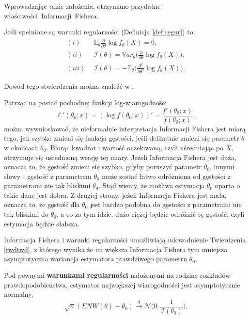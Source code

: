 Wprowadzając takie założenia, otrzymano przydatne właściwości~Informacji~Fishera.

\begin{proposition}\label{prop:warunki}
Jeśli spełnione są warunki regularności (Definicja \ref{def:regur}) to:
\begin{align*}
(i) \ & \ \mathbb{E}_\theta\frac{\partial}{\partial\theta}\log f_{\theta}(X) = 0, \\
(ii) \ & \ \mathcal{I}(\theta) = \mathbb{V}ar_{\theta}\Big(\frac{\partial}{\partial\theta}\log f_{\theta}(X) \Big), \\
(iii) \ & \ \mathcal{I}(\theta) = -\mathbb{E}_{\theta}\Big(\frac{\partial^2}{\partial\theta^2}\log f_\theta(X) \Big).
\end{align*}
\end{proposition}

Dowód tego stwierdzenia można znaleźć w \cite{niemiro}.

\newpage
Patrząc na postać pochodnej funkcji log-wiarogodności
$$\ell'(\theta_0;x) = (\log f(\theta_0;x))' = \dfrac{f'(\theta_0;x)}{f(\theta_0;x)},$$
można wywnioskować, że nieformalnie interpretacja Informacji Fishera jest miarą tego, jak szybko zmieni się funkcja gęstości, jeśli delikatnie zmieni się parametr $\theta$ w okolicach $\theta_0$. Biorąc kwadrat i wartość oczekiwaną, czyli uśredniając po $X$, otrzymuje się uśrednioną wersję tej miary. Jeżeli Informacja Fishera jest duża, oznacza to, że gęstość zmieni się szybko, gdyby poruszyć parametr $\theta_0$, innymi słowy - gęstość z parametrem $\theta_0$ może zostać łatwo odróżniona od gęstości z parametrami nie tak bliskimi $\theta_0$.
Stąd wiemy, że możliwa estymacja $\theta_0$ oparta o takie dane jest dobra. Z drugiej strony, jeżeli
Informacja Fishera jest mała, oznacza to, że gęstość dla $\theta_0$ jest bardzo podobna do gęstości z parametrami nie tak bliskimi do $\theta_0$, a co za tym idzie, dużo ciężej będzie odróżnić tę gęstość, czyli estymacja będzie słabsza.

Informacja Fishera i warunki regularności umożliwiają udowodnienie Twierdzenia \ref{twdtwd}, z którego wynika że im większa Informacja Fishera tym mniejsza asymptotyczna wariancja estymatora prawdziwego parametru $\theta_0$.

\begin{theorem}\label{twdtwd}
Pod pewnymi \textbf{warunkami regularności} nałożonymi na rodzinę rozkładów prawdopodobieństwa, estymator największej wiarogodności jest asymptotycznie normalny, 
$$ \sqrt{n}(ENW(\theta) - \theta_0) \overset{d}{\rightarrow} \mathcal{N}\Big(0, \dfrac{1}{\mathcal{I}(\theta_0)}\Big).$$
\end{theorem}

